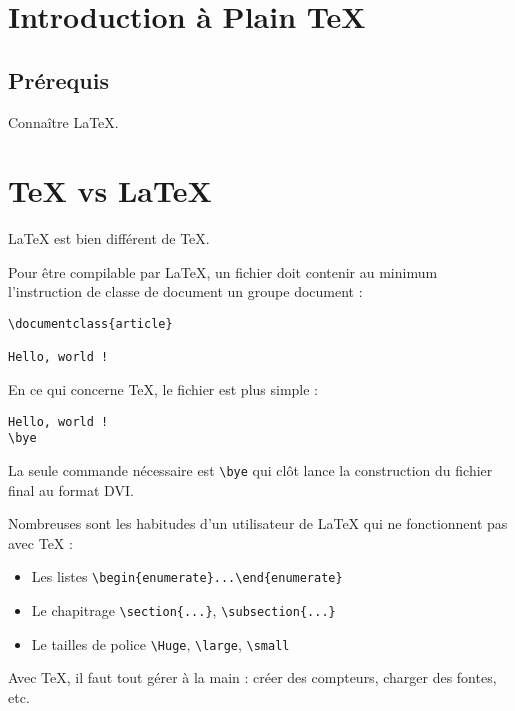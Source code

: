 \section{Introduction à Plain TeX}\label{introduction-uxe0-plain-tex}

\subsection{Prérequis}\label{pruxe9requis}

Connaître LaTeX.

\section{TeX vs LaTeX}\label{tex-vs-latex}

LaTeX est bien différent de TeX.

Pour être compilable par LaTeX, un fichier doit contenir au minimum
l'instruction de classe de document un groupe document :

\begin{verbatim}
\documentclass{article}

Hello, world !

\end{verbatim}

En ce qui concerne TeX, le fichier est plus simple :

\begin{verbatim}
Hello, world !
\bye
\end{verbatim}

La seule commande nécessaire est \texttt{\textbackslash{}bye} qui clôt
lance la construction du fichier final au format DVI.

Nombreuses sont les habitudes d'un utilisateur de LaTeX qui ne
fonctionnent pas avec TeX :

\begin{itemize}
\tightlist
\item
  Les listes
  \texttt{\textbackslash{}begin\{enumerate\}...\textbackslash{}end\{enumerate\}}
\item
  Le chapitrage \texttt{\textbackslash{}section\{...\}},
  \texttt{\textbackslash{}subsection\{...\}}
\item
  Le tailles de police \texttt{\textbackslash{}Huge},
  \texttt{\textbackslash{}large}, \texttt{\textbackslash{}small}
\end{itemize}

Avec TeX, il faut tout gérer à la main : créer des compteurs, charger
des fontes, etc.

